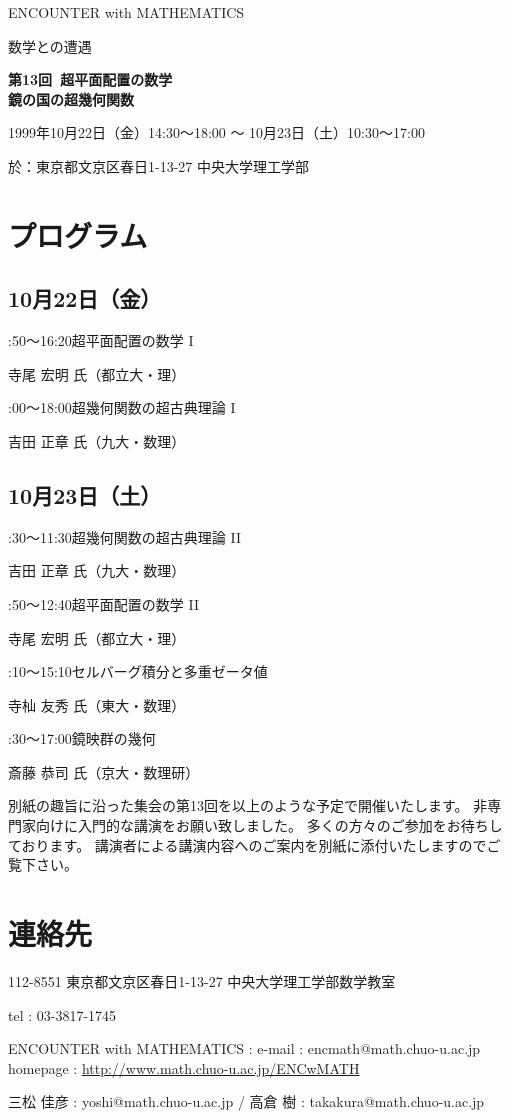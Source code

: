 \documentclass[uplatex,dvipdfmx]{jlreq}
\newcommand{\talk}[3]{%
\noindent
#1\quad #2\par
\hspace*{2em}#3\par\smallskip
}
\newcommand{\EwMnumber}{第13回}
\newcommand{\EwMtitle}{超平面配置の数学\\[2mm]\large 鏡の国の超幾何関数}
\newcommand{\EwMdate}{1999年10月22日（金）14:30～18:00 ～ 10月23日（土）10:30～17:00}
\newcommand{\EwMplace}{東京都文京区春日1-13-27 中央大学理工学部}
\newcommand{\EwMtitleblock}{

\vspace*{-5mm}

\begin{center}

{\Large ENCOUNTER with MATHEMATICS}

\vspace{2mm}

{\large 数学との遭遇}

\vspace{4mm}

{\Large \bfseries \EwMnumber\ \EwMtitle}

\vspace{4mm}

\EwMdate

\vspace{2mm}

於：\EwMplace

\end{center}

\vspace{2mm}

}
\begin{document}
\EwMtitleblock


\section*{プログラム}

\subsection*{10月22日（金）}

\talk
{14:50～16:20}
{超平面配置の数学 I}
{寺尾 宏明 氏（都立大・理）}

\talk
{17:00～18:00}
{超幾何関数の超古典理論 I}
{吉田 正章 氏（九大・数理）}

\subsection*{10月23日（土）}

\talk
{10:30～11:30}
{超幾何関数の超古典理論 II}
{吉田 正章 氏（九大・数理）}

\talk
{11:50～12:40}
{超平面配置の数学 II}
{寺尾 宏明 氏（都立大・理）}

\talk
{14:10～15:10}
{セルバーグ積分と多重ゼータ値}
{寺杣 友秀 氏（東大・数理）}

\talk
{15:30～17:00}
{鏡映群の幾何}
{斎藤 恭司 氏（京大・数理研）}


\bigskip

別紙の趣旨に沿った集会の第13回を以上のような予定で開催いたします。  
非専門家向けに入門的な講演をお願い致しました。  
多くの方々のご参加をお待ちしております。  
講演者による講演内容へのご案内を別紙に添付いたしますのでご覧下さい。


\section*{連絡先}

112-8551 東京都文京区春日1-13-27 中央大学理工学部数学教室 

tel : 03-3817-1745  

ENCOUNTER with MATHEMATICS : e-mail : encmath@math.chuo-u.ac.jp  
homepage : \url{http://www.math.chuo-u.ac.jp/ENCwMATH}  

三松 佳彦 : yoshi@math.chuo-u.ac.jp / 高倉 樹 : takakura@math.chuo-u.ac.jp
\end{document}
